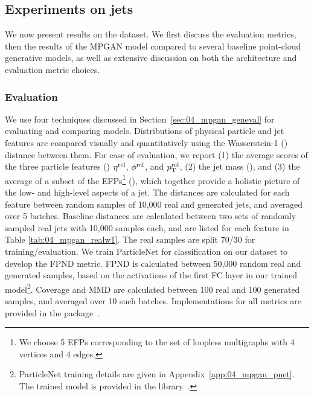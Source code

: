 \subsection{Experiments on jets}
\label{sec:04_mpgan_exp}

We now present results on the \jetnet dataset.
We first discuss the evaluation metrics, then the results of the MPGAN model compared to several baseline point-cloud generative models, as well as extensive discussion on both the architecture and evaluation metric choices.

\subsubsection{Evaluation}
\label{sec:04_mpgan_eval}

We use four techniques discussed in Section~\ref{sec:04_mpgan_geneval} for evaluating and comparing models.
Distributions of physical particle and jet features are compared visually and quantitatively using the Wasserstein-1 (\wass) distance between them.
For ease of evaluation, we report (1) the average scores of the three particle features (\wassp) $\eta^{\mathrm{rel}}$, $\phi^{\mathrm{rel}}$, and $p_{\mathrm{T}}^{\mathrm{rel}}$, (2) the jet mass (\wassm), and (3) the average of a subset of the EFPs\footnote{We choose 5 EFPs corresponding to the set of loopless multigraphs with 4 vertices and 4 edges.}
(\wassefp), which together provide a holistic picture of the low- and high-level aspects of a jet.
The \wass distances are calculated for each feature between random samples of 10,000 real and generated jets, and averaged over 5 batches.
Baseline \wass distances are calculated between two sets of randomly sampled real jets with 10,000 samples each, and are listed for each feature in Table \ref{tab:04_mpgan_realw1}.
The real samples are split 70/30 for training/evaluation.
We train ParticleNet for classification on our dataset to develop the FPND metric.
FPND is calculated between 50,000 random real and generated samples, based on the activations of the first FC layer in our trained model\footnote{ParticleNet training details are given in Appendix~\ref{app:04_mpgan_pnet}. The trained model is provided in the \jetnet library~\cite{jetnetlib}.}.
Coverage and MMD are calculated between 100 real and 100 generated samples, and averaged over 10 such batches.
Implementations for all metrics are provided in the \jetnet package~\cite{jetnetlib}.


